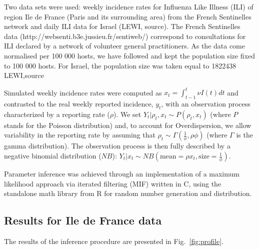 Two data sets were used: weekly incidence rates for Influenza Like
Illness (ILI) of region Ile de France (Paris and its surrounding area) from
the French Sentinelles network and daily ILI data for Israel (LEWI, source). The French
Sentinelles data (http://websenti.b3e.jussieu.fr/sentiweb/) correspond to consultations for ILI declared by a network of volunteer general practitioners.  As the
data come normalised per 100 000 hosts, we have followed
\citep{Finkenstaedt2005} and kept the population size fixed to 100 000
hosts.
For Israel, the population size was taken equal to 1822438 LEWI,source 

Simulated weekly incidence rates were computed as
$x_t=\int_{t-1}^t \nu I(t) dt$ and contrasted to the real weekly
reported incidence, $y_t$, with an observation process characterized by a
reporting rate ($\rho$). We set $Y_t | \rho_t,x_t \sim P(\rho_t,x_t)$
(where $P$ stands for the Poisson distribution) and, to account for
Overdispersion, we allow variability in the reporting rate by assuming
that $\rho_t \sim \Gamma(\frac{1}{\phi}, \rho \phi)$ (where $\Gamma$
is the gamma distribution).  The observation process is then fully
described by a negative binomial distribution ($NB$): $Y_t | x_t \sim
NB(\mathrm{mean}=\rho x_t, \mathrm{size}=\frac{1}{\phi})$.

Parameter inference was achieved through an implementation of a maximum
likelihood approach via iterated filtering (MIF) \citep{Ionides2006, Breto2009}
written in C, using the standalone math library from R \citep{R2008}
for random number generation and distribution.



\subsection{Results for Ile de France data}

The results of the inference procedure are presented in
Fig.~\ref{fig:profile}.


